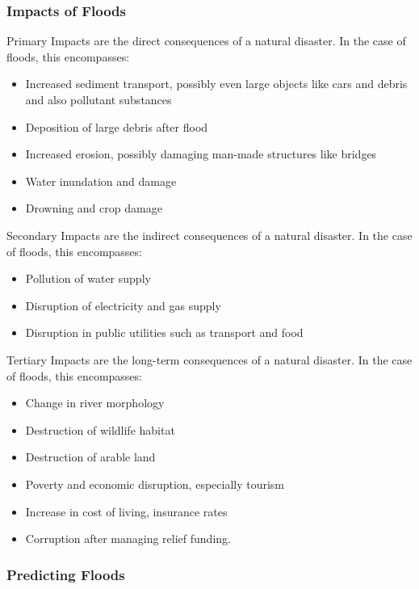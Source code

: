 \documentclass[../../main]{subfiles}
\begin{document}
\subsubsection{Impacts of Floods}

	Primary Impacts are the direct consequences of a natural disaster. In the case of floods, this encompasses:

	\begin{itemize}
		\item Increased sediment transport, possibly even large objects like cars and debris and also pollutant substances
		\item Deposition of large debris after flood
		\item Increased erosion, possibly damaging man-made structures like bridges
		\item Water inundation and damage
		\item Drowning and crop damage
	\end{itemize}

	Secondary Impacts are the indirect consequences of a natural disaster. In the case of floods, this encompasses:

	\begin{itemize}
		\item Pollution of water supply
		\item Disruption of electricity and gas supply
		\item Disruption in public utilities such as transport and food
	\end{itemize}

	Tertiary Impacts are the long-term consequences of a natural disaster. In the case of floods, this encompasses:

	\begin{itemize}
		\item Change in river morphology
		\item Destruction of wildlife habitat
		\item Destruction of arable land
		\item Poverty and economic disruption, especially tourism
		\item Increase in cost of living, insurance rates
		\item Corruption after managing relief funding.
	\end{itemize}

\subsubsection{Predicting Floods}
\end{document}
